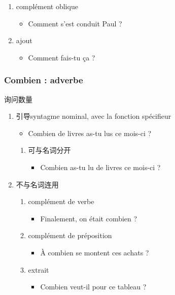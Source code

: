 \documentclass[UTF8]{report}
\begin{document}
\begin{enumerate}
\begin{enumerate}
\begin{itemize}
        \end{itemize}
        \item complément oblique
        \begin{itemize}
            \item Comment s’est conduit Paul ?
        \end{itemize}
        \item ajout
        \begin{itemize}
            \item Comment fais-tu ça ?
        \end{itemize}
    \end{enumerate}
\end{enumerate}

\subsubsection{Combien : adverbe}
询问数量
\begin{enumerate}
    \item 引导syntagme nominal, avec la fonction spécifieur
    \begin{itemize}
        \item Combien de livres as-tu lus ce mois-ci ?
    \end{itemize}
    \begin{enumerate}
        \item 可与名词分开
        \begin{itemize}
            \item Combien as-tu lu de livres ce mois-ci ?
        \end{itemize}
    \end{enumerate}
    \item 不与名词连用
    \begin{enumerate}
        \item complément de verbe
        \begin{itemize}
            \item Finalement, on était combien ?
        \end{itemize}
        \item complément de préposition
        \begin{itemize}
            \item À combien se montent ces achats ?
        \end{itemize}
        \item extrait
        \begin{itemize}
            \item Combien veut-il pour ce tableau ?
        \end{itemize}
    \end{enumerate}
\end{enumerate}
\end{document}
